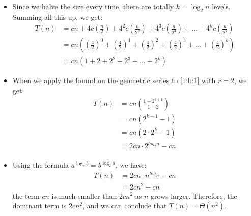 \documentclass{article}
\begin{document}
	\begin{itemize}
		\item Since we halve the size every time, there are totally \( k = \log_{2}n \) levels. Summing all this up, we get:
		\begin{align}
			T(n) &= cn + 4c\left(\frac{n}{2}\right) + 4^2c\left(\frac{n}{2^2}\right) + 4^3c\left(\frac{n}{2^3}\right) + \ldots + 4^kc\left(\frac{n}{2^k}\right) \\
			     &= cn\left(\left(\frac{4}{2}\right)^0 + \left(\frac{4}{2}\right)^1+ \left(\frac{4}{2}\right)^2 + \left(\frac{4}{2}\right)^3 + ... + \left(\frac{4}{2}\right)^k \right)\\ 
				 &= cn(1 + 2 + 2^2 + 2^3 + ... + 2^k) \label{1:b:1}
		\end{align}
		\item When we apply the bound on the geometric series to \eqref{1:b:1} with \( r = 2 \), we get:
		\begin{align}
			T(n) &= cn(\frac{1 - 2^{k + 1}}{1 - 2})\\
			     &= cn(2^{k + 1} - 1) \\
				 &= cn\left(2\cdot2^k - 1\right) \\
				 &= 2cn\cdot2^{log_2n} - cn \\
		\end{align}
		\item Using the formula \( a^{\log_2b} = b^{\log_2a} \), we have:
		\begin{align}
			T(n) &= 2cn\cdot n^{log_22} - cn \\
				 &= 2cn^2 - cn
		\end{align}
		the term \(cn\) is much smaller than \(2cn^2\) as \(n\) grows larger. Therefore, the dominant term is \(2cn^2\), and we can conclude that \(T(n) = \Theta(n^2)\).
	\end{itemize}
\end{document}
